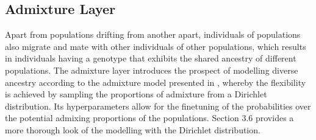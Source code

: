 \documentclass[a4paper, 11pt]{article}
\begin{document}





\subsection{Admixture Layer}

Apart from populations drifting from another apart, individuals of populations also migrate and mate with other individuals of other populations, which results in individuals having a genotype that exhibits the shared ancestry of different populations. The admixture layer introduces the prospect of modelling diverse ancestry according to the admixture model presented in \cite{pritchard2000inference}, whereby the flexibility is achieved by sampling the proportions of admixture from a Dirichlet distribution. Its hyperparameters allow for the finetuning of the probabilities over the potential admixing proportions of the populations. Section 3.6 provides a more thorough look of the modelling with the Dirichlet distribution.
\end{document}
